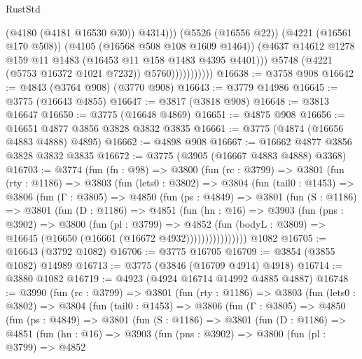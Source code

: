 \begin{lexlean}{RustStd}
\begin{coremodule}
{\begin{coremodule}
{{{{{{{{{{{{{{{{{{{{{{{{{{{{{{{                                  (@4180 (@4181 @16530 @30))
                                  @4314)))
                            (@5526 (@16556 @22))
                            (@4221 (@16561 @170 @508))
                            (@4105 (@16568 @508 @108 @1609 @1464))
                            (@4637 @14612 @1278 @159 @11 @1483 (@16453 @11 @158 @1483 @4395 @4401)))
                          @5748
                          (@4221 (@5753 @16372 @1021 @7232))
                          @5760)))))))))))
@16638 := @3758 @908
@16642 := @4843 (@3764 @908) (@3770 @908)
@16643 := @3779 @14986
@16645 := @3775 (@16643 @4855)
@16647 := @3817 (@3818 @908)
@16648 := @3813 @16647
@16650 := @3775 (@16648 @4869)
@16651 := @4875 @908
@16656 := @16651 @4877 @3856 @3828 @3832 @3835
@16661 := @3775 (@4874 (@16656 @4883 @4888) @4895)
@16662 := @4898 @908
@16667 := @16662 @4877 @3856 @3828 @3832 @3835
@16672 := @3775 (@3905 (@16667 @4883 @4888) @3368)
@16703 := @3774
    (fun (fn : @98) =>
    @3800
      (fun (rc : @3799) =>
      @3801
        (fun (rty : @1186) =>
        @3803
          (fun (lets0 : @3802) =>
          @3804
            (fun (tail0 : @1453) =>
            @3806
              (fun (Γ : @3805) =>
              @4850
                (fun (ps : @4849) =>
                @3801
                  (fun (S : @1186) =>
                  @3801
                    (fun (D : @1186) =>
                    @4851
                      (fun (hn : @16) =>
                      @3903
                        (fun (pns : @3902) =>
                        @3800
                          (fun (pl : @3799) =>
                          @4852
                            (fun (bodyL : @3809) =>
                            @16645 (@16650 (@16661 (@16672 @4932))))))))))))))))
    @1082
@16705 := @16643 (@3792 @1082)
@16706 := @3775 @16705
@16709 := @3854 (@3855 @1082) @14989
@16713 := @3775 (@3846 (@16709 @4914) @4918)
@16714 := @3880 @1082
@16719 := @4923 (@4924 @16714 @14992 @4885 @4887)
@16748 := @3990
    (fun (rc : @3799) =>
    @3801
      (fun (rty : @1186) =>
      @3803
        (fun (lets0 : @3802) =>
        @3804
          (fun (tail0 : @1453) =>
          @3806
            (fun (Γ : @3805) =>
            @4850
              (fun (ps : @4849) =>
              @3801
                (fun (S : @1186) =>
                @3801
                  (fun (D : @1186) =>
                  @4851
                    (fun (hn : @16) =>
                    @3903
                      (fun (pns : @3902) =>
                      @3800
                        (fun (pl : @3799) =>
                        @4852
}}}}}}}}}}}}}}}}}}}}}}}}}}}}}}}
\end{coremodule}}
\end{coremodule}
\end{lexlean}
